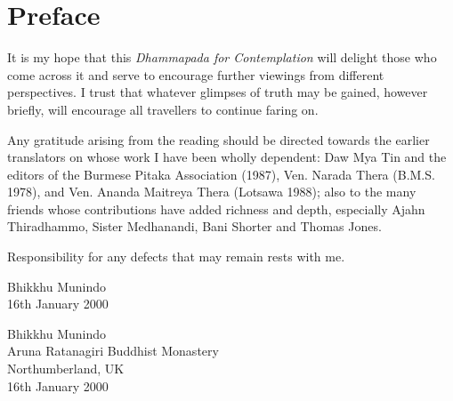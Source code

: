 

\chapter[Preface to the first edition (2000)]{Preface}

It is my hope that this \emph{Dhammapada for Contemplation} will delight those who come across it and serve to encourage further viewings from different perspectives. I trust that whatever glimpses of truth may be gained, however briefly, will encourage all travellers to continue faring on.

Any gratitude arising from the reading should be directed towards the earlier translators on whose work I have been wholly dependent: Daw Mya Tin and  the editors of the  Burmese Pitaka Association (1987), Ven. Narada Thera (B.M.S. 1978), and Ven. Ananda Maitreya Thera  (Lotsawa 1988); also to the many friends whose contributions have added richness and depth, especially Ajahn Thiradhammo, Sister Medhanandi, Bani Shorter and Thomas Jones.

Responsibility for any defects that may remain rests with me.

\ifpocketversion

\enlargethispage{\baselineskip}

{\raggedleft
Bhikkhu Munindo\\
16th January 2000
\par}

\else

{\raggedleft
Bhikkhu Munindo\\
Aruna Ratanagiri Buddhist Monastery\\
Northumberland, UK\\
16th January 2000
\par}

\fi

